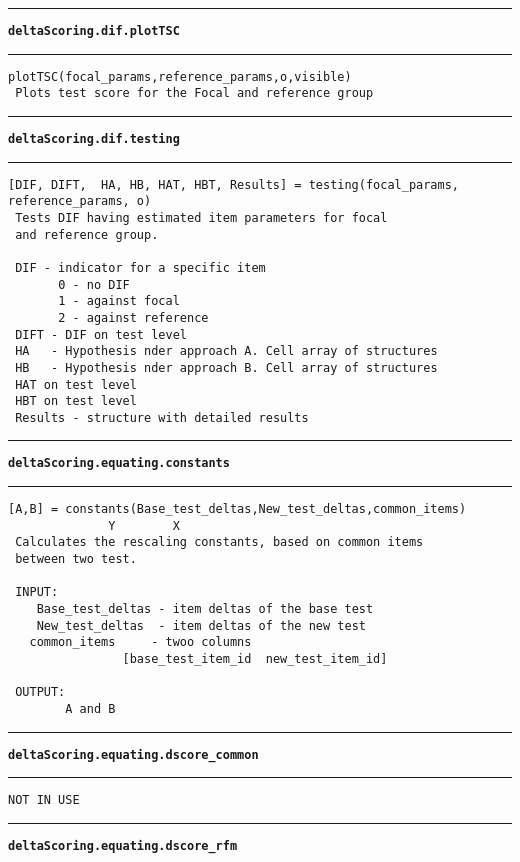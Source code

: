 \par\noindent\rule{\textwidth}{0.4pt}
{\bf\tt deltaScoring.dif.plotTSC}
\par\noindent\rule{\textwidth}{0.4pt}
\begin{lstlisting}[style=Matlab-bw]
 plotTSC(focal_params,reference_params,o,visible)
 Plots test score for the Focal and reference group
\end{lstlisting}
\par\noindent\rule{\textwidth}{0.4pt}
{\bf\tt deltaScoring.dif.testing}
\par\noindent\rule{\textwidth}{0.4pt}
\begin{lstlisting}[style=Matlab-bw]
 [DIF, DIFT,  HA, HB, HAT, HBT, Results] = testing(focal_params, reference_params, o)
 Tests DIF having estimated item parameters for focal
 and reference group.

 DIF - indicator for a specific item
       0 - no DIF
       1 - against focal
       2 - against reference
 DIFT - DIF on test level
 HA   - Hypothesis nder approach A. Cell array of structures
 HB   - Hypothesis nder approach B. Cell array of structures
 HAT on test level
 HBT on test level
 Results - structure with detailed results
\end{lstlisting}
\par\noindent\rule{\textwidth}{0.4pt}
{\bf\tt deltaScoring.equating.constants}
\par\noindent\rule{\textwidth}{0.4pt}
\begin{lstlisting}[style=Matlab-bw]
 [A,B] = constants(Base_test_deltas,New_test_deltas,common_items)
              Y        X
 Calculates the rescaling constants, based on common items
 between two test.

 INPUT:
	Base_test_deltas - item deltas of the base test
	New_test_deltas  - item deltas of the new test
   common_items     - twoo columns
				[base_test_item_id  new_test_item_id]

 OUTPUT:
		A and B
\end{lstlisting}
\par\noindent\rule{\textwidth}{0.4pt}
{\bf\tt deltaScoring.equating.dscore\_common}
\par\noindent\rule{\textwidth}{0.4pt}
\begin{lstlisting}[style=Matlab-bw]
 NOT IN USE
\end{lstlisting}
\par\noindent\rule{\textwidth}{0.4pt}
{\bf\tt deltaScoring.equating.dscore\_rfm}
